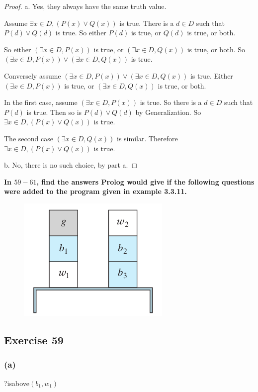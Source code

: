 \documentclass[14pt]{extarticle}
\newcommand{\te}{\exists}
\begin{document}
\begin{proof}
a. Yes, they always have the same truth value. 

Assume $\te x \in D, (P(x) \vee Q(x))$ is true. There is a $d \in D$ such that $P(d) \vee Q(d)$ is true. So either $P(d)$ is true, or $Q(d)$ is true, or both. 

So either $(\te x \in D, P(x))$ is true, or $(\te x \in D, Q(x))$ is true, or both. So $(\te x \in D, P(x)) \vee (\te x \in D, Q(x))$ is true.

Conversely assume $(\te x \in D, P(x)) \vee (\te x \in D, Q(x))$ is true. Either $(\te x \in D, P(x))$ is true, or $(\te x \in D, Q(x))$ is true, or both. 

In the first case, assume $(\te x \in D, P(x))$ is true. So there is a $d \in D$ such that $P(d)$ is true. Then so is $P(d) \vee Q(d)$ by Generalization. So $\te x \in D, (P(x) \vee Q(x))$ is true.

The second case $(\te x \in D, Q(x))$ is similar. Therefore $\te x \in D, (P(x) \vee Q(x))$ is true.

b. No, there is no such choice, by part a.
\end{proof}

{\bf \color{cyan} In $59-61$, find the answers Prolog would give if the following questions were added to the program given in example 3.3.11.}

\begin{figure}[ht!]
\centering
\includegraphics[scale=0.4]{../images/3.3.11.png}
\end{figure}

\subsection{Exercise 59}

\subsubsection{(a)}
?isabove$(b_1, w_1)$
\end{document}

